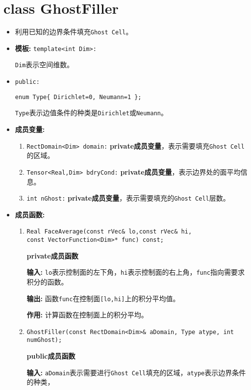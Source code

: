 \documentclass[UTF8]{ctexart}
\theoremstyle{plain}
\theoremstyle{definition}
\theoremstyle{remark}
\begin{document}
\section{class GhostFiller}
\begin{itemize}
    \item 利用已知的边界条件填充\texttt{Ghost Cell}。
    \item \textbf{模板:} \texttt{template<int Dim>:}
    
    \texttt{Dim}表示空间维数。
    \item \texttt{public:}
    
    \texttt{enum Type\{ Dirichlet=0, Neumann=1 \};}

    \texttt{Type}表示边值条件的种类是\texttt{Dirichlet}或\texttt{Neumann}。
    \item \textbf{成员变量:}
    \begin{enumerate}
        \item \texttt{RectDomain<Dim> domain:} \textbf{private成员变量}，表示需要填充\texttt{Ghost Cell}的区域。
        \item \texttt{Tensor<Real,Dim> bdryCond:} \textbf{private成员变量}，表示边界处的面平均信息。
        \item \texttt{int nGhost:} \textbf{private成员变量}，表示需要填充的\texttt{Ghost Cell}层数。
    \end{enumerate}
    \item \textbf{成员函数:}
    \begin{enumerate}
        \item \texttt{Real FaceAverage(const rVec\& lo,const rVec\& hi,\\const VectorFunction<Dim>* func) const;}
        
        \textbf{private成员函数}

        \textbf{输入:} \texttt{lo}表示控制面的左下角，\texttt{hi}表示控制面的右上角，\texttt{func}指向需要求积分的函数。

        \textbf{输出:} 函数\texttt{func}在控制面\texttt{[lo,hi]}上的积分平均值。

        \textbf{作用:} 计算函数在控制面上的积分平均。

        \item \texttt{GhostFiller(const RectDomain<Dim>\& aDomain, Type atype, int numGhost);}
        
        \textbf{public成员函数}

        \textbf{输入:} \texttt{aDomain}表示需要进行\texttt{Ghost Cell}填充的区域，\texttt{atype}表示边界条件的种类， 
        

\end{enumerate}
\end{itemize}
\end{document}
